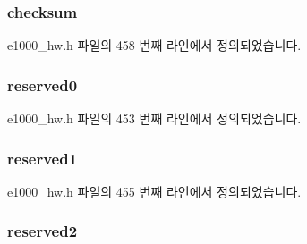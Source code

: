 \subsubsection[{\texorpdfstring{checksum}{checksum}}]{ checksum}\hypertarget{structe1000__host__mng__dhcp__cookie_afd93107fee98407f162be1294fb053fd}{}\label{structe1000__host__mng__dhcp__cookie_afd93107fee98407f162be1294fb053fd}


e1000\+\_\+hw.\+h 파일의 458 번째 라인에서 정의되었습니다.

\subsubsection[{\texorpdfstring{reserved0}{reserved0}}]{ reserved0}\hypertarget{structe1000__host__mng__dhcp__cookie_a9ca2a9c78f44020325c0766d88e86a4f}{}\label{structe1000__host__mng__dhcp__cookie_a9ca2a9c78f44020325c0766d88e86a4f}


e1000\+\_\+hw.\+h 파일의 453 번째 라인에서 정의되었습니다.

\subsubsection[{\texorpdfstring{reserved1}{reserved1}}]{ reserved1}\hypertarget{structe1000__host__mng__dhcp__cookie_a3bfac4a72761ec71f969cf4db1557498}{}\label{structe1000__host__mng__dhcp__cookie_a3bfac4a72761ec71f969cf4db1557498}


e1000\+\_\+hw.\+h 파일의 455 번째 라인에서 정의되었습니다.

\subsubsection[{\texorpdfstring{reserved2}{reserved2}}]{ reserved2}\hypertarget{structe1000__host__mng__dhcp__cookie_abb0880e72f68cfaf6a809f9e12d88e61}{}\label{structe1000__host__mng__dhcp__cookie_abb0880e72f68cfaf6a809f9e12d88e61}


